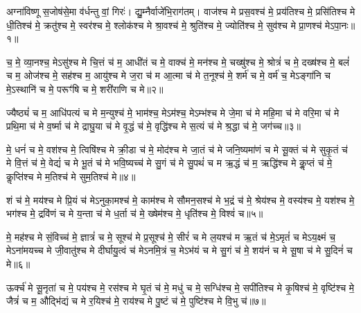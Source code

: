 
{\anuvakamend[{घा॒सिं कश॑या तपद्र॒यिं नव॑ च॥९॥}]}

\setcounter{anuvakam}{0}
अग्ना॑विष्णू स॒जोष॑से॒मा व॑र्धन्तु वां॒ गिरः॑। द्यु॒म्नैर्वाजे॑भि॒राग॑तम्। वाज॑श्च मे प्रस॒वश्च॑ मे॒ प्रय॑तिश्च मे॒ प्रसि॑तिश्च मे धी॒तिश्च॑ मे॒ क्रतु॑श्च मे॒ स्वर॑श्च मे॒ श्लोक॑श्च मे श्रा॒वश्च॑ मे॒ श्रुति॑श्च मे॒ ज्योति॑श्च मे॒ सुव॑श्च मे प्रा॒णश्च॑ मेऽपा॒नः॥१॥

च॒ मे॒ व्या॒नश्च॒ मेऽसु॑श्च मे चि॒त्तं च॑ म॒ आधी॑तं च मे॒ वाक्च॑ मे॒ मन॑श्च मे॒ चख्षु॑श्च मे॒ श्रोत्रं॑ च मे॒ दख्ष॑श्च मे॒ बलं॑ च म॒ ओज॑श्च मे॒ सह॑श्च म॒ आयु॑श्च मे ज॒रा च॑ म आ॒त्मा च॑ मे त॒नूश्च॑ मे॒ शर्म॑ च मे॒ वर्म॑ च॒ मेऽङ्गा॑नि च मे॒ऽस्थानि॑ च मे॒ परूꣳ॑षि च मे॒ शरी॑राणि च मे॥२॥

{\anuvakamend[{अ॒पा॒नस्त॒नूश्च॑ मे॒ऽष्टाद॑श च॥१॥}]}

ज्यैष्ठ्यं॑ च म॒ आधि॑पत्यं च मे म॒न्युश्च॑ मे॒ भाम॑श्च॒ मेऽम॑श्च॒ मेऽम्भ॑श्च मे जे॒मा च॑ मे महि॒मा च॑ मे वरि॒मा च॑ मे प्रथि॒मा च॑ मे व॒र्ष्मा च॑ मे द्राघु॒या च॑ मे वृ॒द्धं च॑ मे॒ वृद्धि॑श्च मे स॒त्यं च॑ मे श्र॒द्धा च॑ मे॒ जग॑च्च॥३॥

मे॒ धनं॑ च मे॒ वश॑श्च मे॒ त्विषि॑श्च मे क्री॒डा च॑ मे॒ मोद॑श्च मे जा॒तं च॑ मे जनि॒ष्यमा॑णं च मे सू॒क्तं च॑ मे सुकृ॒तं च॑ मे वि॒त्तं च॑ मे॒ वेद्यं॑ च मे भू॒तं च॑ मे भवि॒ष्यच्च॑ मे सु॒गं च॑ मे सु॒पथं॑ च म ऋ॒द्धं च॑ म॒ ऋद्धि॑श्च मे कॢ॒प्तं च॑ मे॒ कॢप्ति॑श्च मे म॒तिश्च॑ मे सुम॒तिश्च॑ मे॥४॥

{\anuvakamend[{जग॒च्चर्द्धि॒श्चतु॑र्दश च॥२॥}]}

शं च॑ मे॒ मय॑श्च मे प्रि॒यं च॑ मेऽनुका॒मश्च॑ मे॒ काम॑श्च मे सौमन॒सश्च॑ मे भ॒द्रं च॑ मे॒ श्रेय॑श्च मे॒ वस्य॑श्च मे॒ यश॑श्च मे॒ भग॑श्च मे॒ द्रवि॑णं च मे य॒न्ता च॑ मे ध॒र्ता च॑ मे॒ ख्षेम॑श्च मे॒ धृति॑श्च मे॒ विश्वं॑ च॥५॥

मे॒ मह॑श्च मे सं॒विच्च॑ मे॒ ज्ञात्रं॑ च मे॒ सूश्च॑ मे प्र॒सूश्च॑ मे॒ सीरं॑ च मे ल॒यश्च॑ म ऋ॒तं च॑ मे॒ऽमृतं॑ च मेऽय॒क्ष्मं च॒ मेऽना॑मयच्च मे जी॒वातु॑श्च मे दीर्घायु॒त्वं च॑ मेऽनमि॒त्रं च॒ मेऽभ॑यं च मे सु॒गं च॑ मे॒ शय॑नं च मे सू॒षा च॑ मे सु॒दिनं॑ च मे॥६॥

{\anuvakamend[{विश्वं॑ च॒ शय॑नम॒ष्टौ च॑॥३॥}]}

ऊर्क्च॑ मे सू॒नृता॑ च मे॒ पय॑श्च मे॒ रस॑श्च मे घृ॒तं च॑ मे॒ मधु॑ च मे॒ सग्धि॑श्च मे॒ सपी॑तिश्च मे कृ॒षिश्च॑ मे॒ वृष्टि॑श्च मे॒ जैत्रं॑ च म॒ औद्भि॑द्यं च मे र॒यिश्च॑ मे॒ राय॑श्च मे पु॒ष्टं च॑ मे॒ पुष्टि॑श्च मे वि॒भु च॑॥७॥

